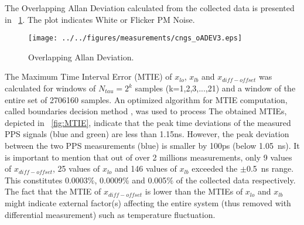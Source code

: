 The Overlapping Allan Deviation calculated from the collected data is presented in 
\figurename~\ref{fig:oADEV}. The plot indicates White or Flicker PM Noise. 

\begin{figure}[!t]
\centering
\texttt{[image: ../../figures/measurements/cngs\_oADEV3.eps]}
\caption{Overlapping Allan Deviation.}
\label{fig:oADEV}
\end{figure}

% 

The Maximum Time Interval Error (MTIE) of $x_{lo}$, $x_{lb}$ and $x_{diff-offset}$ 
was calculated for windows of $N_{tau}=2^k$ samples (k=1,2,3,...,21) and a window of the entire 
set of 2706160 samples. An optimized algorithm for MTIE
computation, called boundaries decision method \cite{biblio:MTIE}, was used to process 
The obtained MTIEs, depicted in \figurename~\ref{fig:MTIE},
indicate that the peak time deviations of the measured PPS signals (blue and green) are less than 1.15ns. 
However, the peak deviation between the two PPS measurements (blue) is smaller by 100ps 
(below 1.05~ns). It is important to mention that out of over 
2 millions measurements, only 9 values of $x_{diff-offset}$, 25 values of $x_{lo}$ and 146 values of 
$x_{lb}$ exceeded the $\pm$0.5~ns range. This constitutes 
0.0003$\%$, 0.0009$\%$ and 0.005$\%$ of the collected data respectively. The fact that the 
MTIE of $x_{diff-offset}$ is lower than the MTIEs of $x_{lo}$ and $x_{lb}$ might indicate 
external factor(s) affecting the entire system (thus removed with differential measurement) such
as temperature fluctuation.


